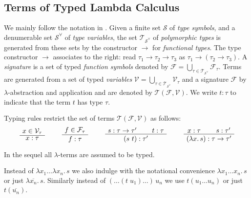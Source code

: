\subsection{Terms of Typed Lambda Calculus}
\label{sec:terms-typed-lambda-calculus}
We mainly follow the notation in \cite{Mayr-Nipkow-TCS}. Given a finite set $\mathcal{S}$ of {\em type symbols}, and a denumerable set $\mathcal{S^{\forall}}$ of {\em type variables}, the set $\mathcal{T_{\mathcal{S^{\forall}}}}$ of {\em polymorphic types} is generated from these sets by the constructor $\to$ for {\em functional types}. 
The type constructor $\to$ associates to the right: read $\tau_1 \to \tau_2 \to \tau_3$ as $\tau_1 \to (\tau_2 \to \tau_3)$. 
A {\em signature} is a set of typed {\em function symbols} denoted by $\mathcal{F} = \bigcup_{\tau \in \mathcal{T_{\mathcal{S^{\forall}}}}} \mathcal{F}_{\tau}$. Terms are generated from a set of typed {\em variables} $\mathcal{V} = \bigcup_{\tau \in \mathcal{T_{\mathcal{S^{\forall}}}}} \mathcal{V}_{\tau}$ and a signature $\mathcal{F}$ 
by $\lambda$-abstraction and application and are denoted by $\mathcal{T}(\mathcal{F},\mathcal{V})$. We write $t:\tau$ to indicate that the term $t$ has type $\tau$.

Typing rules restrict the set of terms $\mathcal{T}(\mathcal{F},\mathcal{V})$ as follows:
\begin{displaymath}
\begin{array}{cccc}
\AxiomC{$x \in \mathcal{V}_{\tau}$}
\UnaryInfC{$x : \tau$}
\DisplayProof \,\,\,\,\,\,\,\,\,&
\AxiomC{$f \in \mathcal{F}_{\tau}$}
\UnaryInfC{$f : \tau$}
\DisplayProof \,\,\,\,\,\,\,\,\,&
\AxiomC{$s : \tau \to \tau'$}
\AxiomC{$t : \tau$}
\BinaryInfC{$(s\,\, t) : \tau'$} 
\DisplayProof  \,\,\,\,\,\,\,\,\,&
\AxiomC{$x : \tau$}
\AxiomC{$s : \tau'$}
\BinaryInfC{$(\lambda x.\, s) : \tau \to \tau'$} 
\DisplayProof  
\end{array}
\end{displaymath}

\noindent In the sequel all $\lambda$-terms are assumed to be typed.

Instead of $\lambda x_1\ldots\lambda x_n.\,s$ we also indulge with the notational convenience $\lambda x_1\ldots x_n.\,s$ or just $\lambda \overline{x_n}.\,s$. Similarly instead of $(\ldots (t\;u_1)\ldots)\,u_n$ we use $t(u_1\ldots u_n)$ or just $t(\overline{u_n})$.

